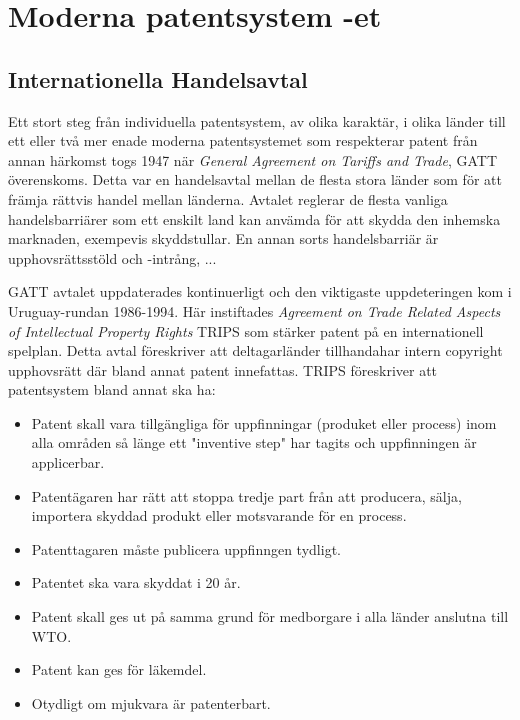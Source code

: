 \section{Moderna patentsystem -et}

\subsection{Internationella Handelsavtal}
Ett stort steg från individuella patentsystem, av olika karaktär, i olika länder till ett eller två mer enade moderna patentsystemet som respekterar patent från annan härkomst togs 1947 när \emph{General Agreement on Tariffs and Trade}, GATT överenskoms. Detta var en handelsavtal mellan de flesta stora länder som för att främja rättvis handel mellan länderna. \cite{gatt} Avtalet reglerar de flesta vanliga handelsbarriärer som ett enskilt land kan anvämda för att skydda den inhemska marknaden, exempevis skyddstullar. En annan sorts handelsbarriär är upphovsrättsstöld och -intrång, ...

GATT avtalet uppdaterades kontinuerligt och den viktigaste uppdeteringen kom i Uruguay-rundan 1986-1994. Här instiftades \emph{Agreement on Trade Related Aspects of Intellectual Property Rights} TRIPS som stärker patent på en internationell spelplan. Detta avtal föreskriver att deltagarländer tillhandahar intern copyright upphovsrätt där bland annat patent innefattas. TRIPS föreskriver att patentsystem bland annat ska ha:

\begin{itemize}
	\item Patent skall vara tillgängliga för uppfinningar (produket eller process) inom alla områden så länge ett "inventive step" har tagits och uppfinningen är applicerbar.
	\item Patentägaren har rätt att stoppa tredje part från att producera, sälja, importera skyddad produkt eller motsvarande för en process.
	\item Patenttagaren måste publicera uppfinngen tydligt.
	\item Patentet ska vara skyddat i 20 år.
	\item Patent skall ges ut på samma grund för medborgare i alla länder anslutna till WTO.
	\item Patent kan ges för läkemdel.
	\item Otydligt om mjukvara är patenterbart.
\end{itemize}	

